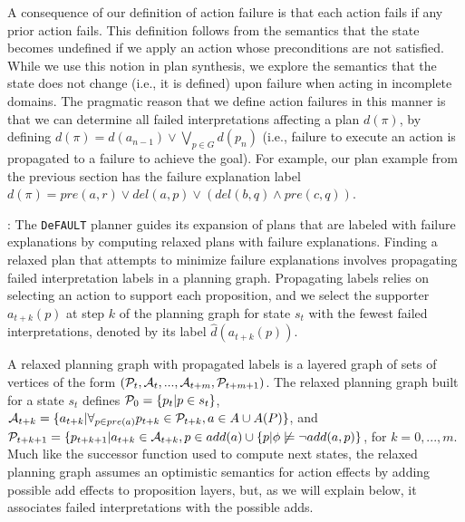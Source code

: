 \documentclass[letterpaper]{article}
\def\und#1{\noindent{\bf #1}:}
\def\citep#1{\cite{#1}}
\def\default{{\tt DeFAULT}}
\begin{document}
A consequence of our definition of action failure is that each action fails if
any prior action fails.  This definition follows from the semantics that the
state becomes undefined if we apply an action whose preconditions are not
satisfied.  While we use this notion in plan synthesis, we explore the semantics
that the state does not change (i.e., it is defined) upon failure when acting in
incomplete domains.  The pragmatic reason that we define action failures in this
manner is that we can determine all failed interpretations affecting a plan $d(\pi)$,
by defining $d(\pi) = d({a}_{n-1}) \vee \bigvee_{p \in G} d(p_n)$ (i.e.,
failure to execute an action is propagated to a
failure to achieve the goal). For example, our plan example from the previous
section has the failure explanation label $d(\pi) = 
pre(a, r) \vee  del(a, p) \vee (del(b, q) \wedge pre(c, q))$.

\und{Incomplete Domain Relaxed Plans} The \default{} planner
\citep{bryce-icaps11} guides its expansion of plans that are labeled with
failure explanations by computing relaxed plans with failure explanations.   Finding a
relaxed plan that attempts to minimize failure explanations involves propagating
failed interpretation labels in a planning graph.  Propagating labels relies on
selecting an action to support each proposition, and we select the supporter
$a_{t+k}(p)$ at step $k$ of the planning graph for state $s_t$ with the
fewest failed interpretations, denoted by its label $\hat{d}(a_{t+k}(p))$.

A relaxed planning graph with propagated labels is a layered graph of sets of
vertices of the form $({\cal P}_t, {\cal A}_t, ..., {\cal A}_{t+m},
{\cal P}_{t+m+1})$. The relaxed planning graph built for a state
${s}_t$ defines ${\cal P}_0 = \{{p}_t | p \in {s}_t\}$,
${\cal A}_{t+k} = \{ {a}_{t+k} | \forall_{p \in {pre}({a})}
{p}_{t+k} \in {\cal P}_{t+k}, {a} \in {A} \cup A(P)\}$, and
${\cal P}_{t+k+1} = \{p_{t+k+1} | {a}_{t+k} \in {\cal A}_{t+k}, p
\in {add}({a}) \cup \{p | \phi\not\models\neg add({a}, p)\}$, for $k
= 0, ..., m$.  Much like the successor function used to compute next states, the
relaxed planning graph assumes an optimistic semantics for action effects by
adding possible add effects to proposition layers, but, as we will explain
below, it associates failed interpretations with the possible adds.
\end{document}
